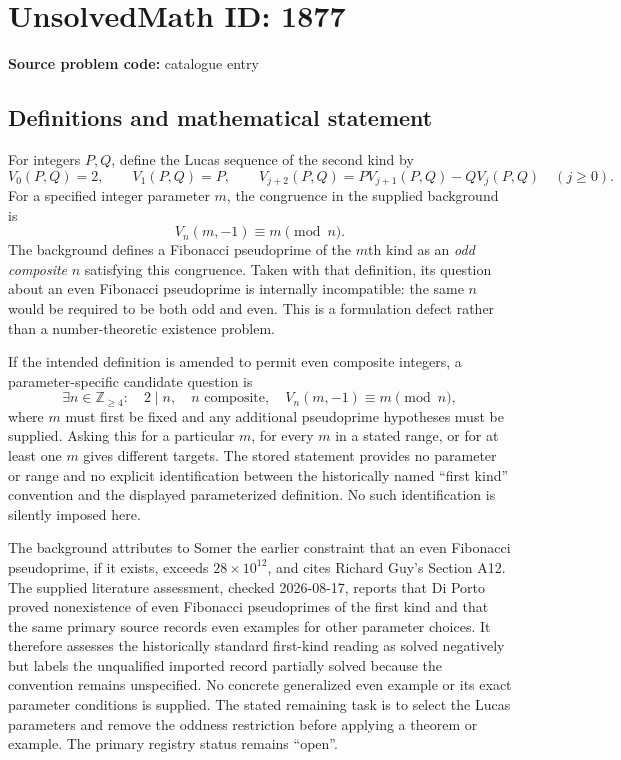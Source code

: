 \documentclass[11pt]{article}
\newcommand{\Z}{\mathbb{Z}}
\begin{document}
\section*{UnsolvedMath ID: 1877}
\textbf{Source problem code:} catalogue entry
\subsection{Definitions and mathematical statement}
For integers $P,Q$, define the Lucas sequence of the second kind by
\[
V_0(P,Q)=2,\qquad V_1(P,Q)=P,\qquad
V_{j+2}(P,Q)=P V_{j+1}(P,Q)-Q V_j(P,Q)\quad(j\geq0).
\]
For a specified integer parameter $m$, the congruence in the supplied background is
\[
V_n(m,-1)\equiv m\pmod n.
\]
The background defines a Fibonacci pseudoprime of the $m$th kind as an \emph{odd composite} $n$ satisfying this congruence. Taken with that definition, its question about an even Fibonacci pseudoprime is internally incompatible: the same $n$ would be required to be both odd and even. This is a formulation defect rather than a number-theoretic existence problem.

If the intended definition is amended to permit even composite integers, a parameter-specific candidate question is
\[
\exists n\in\Z_{\geq4}:\quad 2\mid n,\quad n\text{ composite},\quad
V_n(m,-1)\equiv m\pmod n,
\]
where $m$ must first be fixed and any additional pseudoprime hypotheses must be supplied. Asking this for a particular $m$, for every $m$ in a stated range, or for at least one $m$ gives different targets. The stored statement provides no parameter or range and no explicit identification between the historically named ``first kind'' convention and the displayed parameterized definition. No such identification is silently imposed here.

The background attributes to Somer the earlier constraint that an even Fibonacci pseudoprime, if it exists, exceeds $28\times10^{12}$, and cites Richard Guy's Section A12. The supplied literature assessment, checked 2026-08-17, reports that Di Porto proved nonexistence of even Fibonacci pseudoprimes of the first kind and that the same primary source records even examples for other parameter choices. It therefore assesses the historically standard first-kind reading as solved negatively but labels the unqualified imported record partially solved because the convention remains unspecified. No concrete generalized even example or its exact parameter conditions is supplied. The stated remaining task is to select the Lucas parameters and remove the oddness restriction before applying a theorem or example. The primary registry status remains ``open''.
\end{document}
